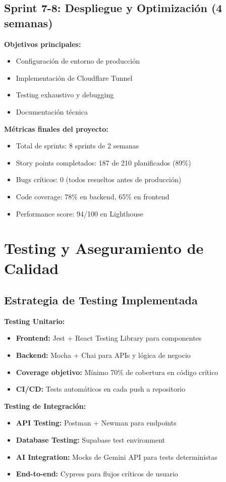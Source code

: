 \documentclass[12pt,a4paper]{report}
\begin{document}
\subsection{Sprint 7-8: Despliegue y Optimización (4 semanas)}

\textbf{Objetivos principales:}
\begin{itemize}
\item Configuración de entorno de producción
\item Implementación de Cloudflare Tunnel
\item Testing exhaustivo y debugging
\item Documentación técnica
\end{itemize}

\textbf{Métricas finales del proyecto:}
\begin{itemize}
\item Total de sprints: 8 sprints de 2 semanas
\item Story points completados: 187 de 210 planificados (89\%)
\item Bugs críticos: 0 (todos resueltos antes de producción)
\item Code coverage: 78\% en backend, 65\% en frontend
\item Performance score: 94/100 en Lighthouse
\end{itemize}

\section{Testing y Aseguramiento de Calidad}

\subsection{Estrategia de Testing Implementada}

\textbf{Testing Unitario:}
\begin{itemize}
\item \textbf{Frontend:} Jest + React Testing Library para componentes
\item \textbf{Backend:} Mocha + Chai para APIs y lógica de negocio
\item \textbf{Coverage objetivo:} Mínimo 70\% de cobertura en código crítico
\item \textbf{CI/CD:} Tests automáticos en cada push a repositorio
\end{itemize}

\textbf{Testing de Integración:}
\begin{itemize}
\item \textbf{API Testing:} Postman + Newman para endpoints
\item \textbf{Database Testing:} Supabase test environment
\item \textbf{AI Integration:} Mocks de Gemini API para tests deterministas
\item \textbf{End-to-end:} Cypress para flujos críticos de usuario
\end{itemize}
\end{document}
